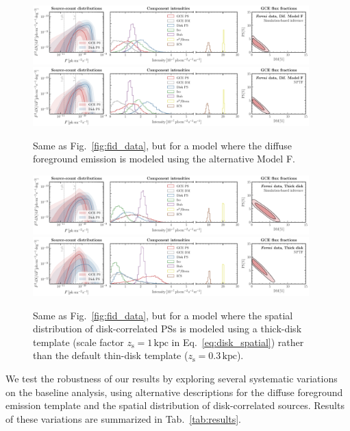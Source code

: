 \documentclass[prd,aps,10pt,nofootinbib,twocolumn,superscriptaddress,preprintnumbers,balancelastpage,longbibliography]{revtex4-1}
\begin{document}
%
\begin{figure}
\centering
\includegraphics[width=0.95\textwidth]{plots/data_fid_sbi_modelF.pdf}
\includegraphics[width=0.95\textwidth]{plots/data_fid_nptf_modelF.pdf}
\caption{Same as Fig.~\ref{fig:fid_data}, but for a model where the diffuse foreground emission is modeled using the alternative Model F.}
\label{fig:fid_data_modelF}
\end{figure}
%

%
\begin{figure}
\centering
\includegraphics[width=0.95\textwidth]{plots/data_fid_sbi_thick.pdf}
\includegraphics[width=0.95\textwidth]{plots/data_fid_nptf_thick.pdf}
\caption{Same as Fig.~\ref{fig:fid_data}, but for a model where the spatial distribution of disk-correlated PSs is modeled using a thick-disk template (scale factor $z_\mathrm{s}=1\,\mathrm{kpc}$ in Eq.~\eqref{eq:disk_spatial}) rather than the default thin-disk template ($z_\mathrm{s}=0.3\,\mathrm{kpc}$).}
\label{fig:fid_data_thick_disk}
\end{figure}
%


We test the robustness of our results by exploring several systematic variations on the baseline analysis, using alternative descriptions for the diffuse foreground emission template and the spatial distribution of disk-correlated sources. Results of these variations are summarized in Tab.~\ref{tab:results}. \\
\end{document}
